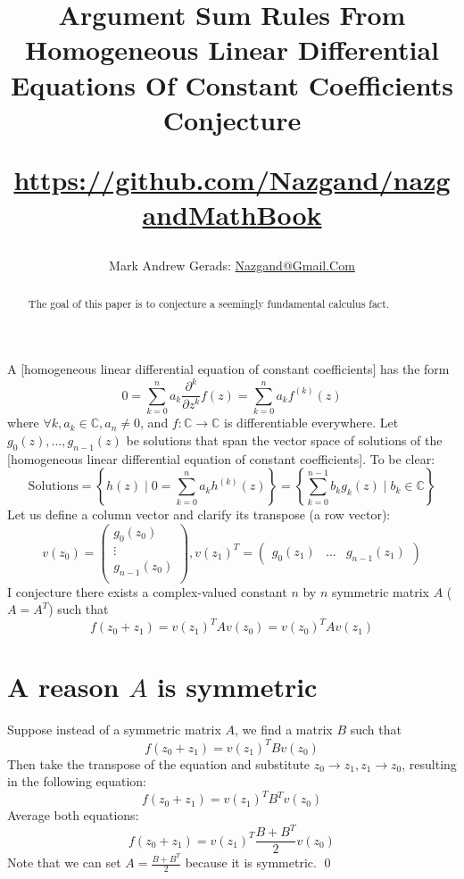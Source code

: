 \documentclass[]{article}
\author{Mark Andrew Gerads: \href{MailTo:Nazgand@Gmail.Com}{Nazgand@Gmail.Com}}
\title{
	Argument Sum Rules From Homogeneous Linear Differential Equations Of Constant Coefficients Conjecture
	
	\href{https://github.com/Nazgand/nazgandMathBook}{https://github.com/Nazgand/nazgandMathBook}
}
\newcommand{\pqty}[1]{{\left(#1\right)}}
\newcommand{\Bqty}[1]{{\left\{#1\right\}}}
\newcommand{\pdiff}[2]{\frac{\partial^{#2}}{\partial #1^{#2}}}
\numberwithin{equation}{section}
\begin{document}
	
	\maketitle
	
	\begin{abstract}
		The goal of this paper is to conjecture a seemingly fundamental calculus fact.
	\end{abstract}
	
	A [homogeneous linear differential equation of constant coefficients] has the form
	\begin{equation}
		0=\sum_{k=0}^{n}a_k\pdiff{z}{k}f\pqty{z}
		=\sum_{k=0}^{n}a_k f^\pqty{k}\pqty{z}
	\end{equation}
	where $\forall k, a_k\in\mathbb{C}, a_n \neq 0$, and $f:\mathbb{C}\to\mathbb{C}$ is differentiable everywhere.
	Let $g_0\pqty{z},\dots,g_{n-1}\pqty{z}$ be solutions that span the vector space of solutions of the [homogeneous linear differential equation of constant coefficients]. To be clear:
	\begin{equation}
		\text{Solutions}=
		\Bqty{h\pqty{z} \mid 0=\sum_{k=0}^{n}a_k h^\pqty{k}\pqty{z}}
		=\Bqty{\sum_{k=0}^{n-1}b_k g_k\pqty{z} \mid b_k\in\mathbb{C}}
	\end{equation}
	Let us define a column vector and clarify its transpose (a row vector):
	\begin{equation}
		v\pqty{z_0}=
		\begin{pmatrix}
			g_0\pqty{z_0} \\
			\vdots \\
			g_{n-1}\pqty{z_0} \\
		\end{pmatrix}
		,
		v\pqty{z_1}^T=
		\begin{pmatrix}
			g_0\pqty{z_1} &
			\dots &
			g_{n-1}\pqty{z_1}
		\end{pmatrix}
	\end{equation}
	I conjecture there exists a complex-valued constant $n$ by $n$ symmetric matrix $A$ ($A=A^T$) such that
	\begin{equation}
		f\pqty{z_0+z_1}=v\pqty{z_1}^T A v\pqty{z_0}=v\pqty{z_0}^T A v\pqty{z_1}
	\end{equation}

	\section{A reason $A$ is symmetric}
	Suppose instead of a symmetric matrix $A$, we find a matrix $B$ such that
	\begin{equation}
		f\pqty{z_0+z_1}=v\pqty{z_1}^T B v\pqty{z_0}
	\end{equation}
	Then take the transpose of the equation and substitute $z_0\to z_1,z_1\to z_0$, resulting in the following equation:
	\begin{equation}
		f\pqty{z_0+z_1}=v\pqty{z_1}^T B^T v\pqty{z_0}
	\end{equation}
	Average both equations:
	\begin{equation}
		f\pqty{z_0+z_1}=v\pqty{z_1}^T \frac{B+B^T}{2} v\pqty{z_0}
	\end{equation}
	Note that we can set $A=\frac{B+B^T}{2}$ because it is symmetric. \qed
\end{document}
